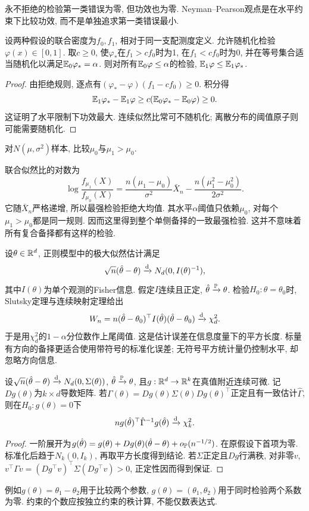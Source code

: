 永不拒绝的检验第一类错误为零, 但功效也为零. Neyman--Pearson观点是在水平约束下比较功效, 而不是单独追求第一类错误最小.
\begin{theorem}
设两种假设的联合密度为$f_0,f_1$, 相对于同一支配测度定义. 允许随机化检验$\varphi(x)\in[0,1]$. 取$c\geq0$, 使$\varphi_*$在$f_1>cf_0$时为1, 在$f_1<cf_0$时为0, 并在等号集合适当随机化以满足$\mathbb E_0\varphi_*=\alpha$. 则对所有$\mathbb E_0\varphi\leq\alpha$的检验, $\mathbb E_1\varphi\leq\mathbb E_1\varphi_*$.
\end{theorem}
\begin{proof}
由拒绝规则, 逐点有$(\varphi_*-\varphi)(f_1-cf_0)\geq0$. 积分得
\[
 \mathbb E_1\varphi_*-\mathbb E_1\varphi\geq c(\mathbb E_0\varphi_*-\mathbb E_0\varphi)\geq0.
\]
这证明了水平限制下功效最大. 连续似然比常可不随机化; 离散分布的阈值原子则可能需要随机化.
\end{proof}
\begin{example}
对$N(\mu,\sigma^2)$样本, 比较$\mu_0$与$\mu_1>\mu_0$.
\end{example}
\begin{solution}
联合似然比的对数为
\[
 \log\frac{f_{\mu_1}(X)}{f_{\mu_0}(X)}
 =\frac{n(\mu_1-\mu_0)}{\sigma^2}\bar X_n
 -\frac{n(\mu_1^2-\mu_0^2)}{2\sigma^2}.
\]
它随$\bar X_n$严格递增, 所以最强检验拒绝大均值. 其水平$\alpha$阈值只依赖$\mu_0$, 对每个$\mu_1>\mu_0$都是同一规则. 因而这里得到整个单侧备择的一致最强检验. 这并不意味着所有复合备择都有这样的检验.
\end{solution}

设$\theta\in\mathbb R^d$, 正则模型中的极大似然估计满足
\[
 \sqrt n(\hat\theta-\theta)\xrightarrow{\mathrm d} N_d(0,I(\theta)^{-1}),
\]
其中$I(\theta)$为单个观测的Fisher信息. 假定$I$连续且正定, $\hat\theta\xrightarrow{\mathbb P}\theta$. 检验$H_0:\theta=\theta_0$时, Slutsky定理与连续映射定理给出
\[
 W_n=n(\hat\theta-\theta_0)^\top I(\hat\theta)(\hat\theta-\theta_0)\xrightarrow{\mathrm d}\chi_d^2.
\]
于是用$\chi_d^2$的$1-\alpha$分位数作上尾阈值. 这是估计误差在信息度量下的平方长度. 标量有方向的备择更适合使用带符号的标准化误差; 无符号平方统计量仍控制水平, 却忽略方向信息.

\begin{proposition}[一般约束的Wald检验]
设$\sqrt n(\hat\theta-\theta)\xrightarrow{\mathrm d} N_d(0,\Sigma(\theta))$, $\hat\theta\xrightarrow{\mathbb P}\theta$, 且$g:\mathbb R^d\to\mathbb R^k$在真值附近连续可微. 记$Dg(\theta)$为$k\times d$导数矩阵. 若$\Gamma(\theta)=Dg(\theta)\Sigma(\theta)Dg(\theta)^\top$正定且有一致估计$\hat\Gamma$, 则在$H_0:g(\theta)=0$下
\[
 n g(\hat\theta)^\top\hat\Gamma^{-1}g(\hat\theta)\xrightarrow{\mathrm d}\chi_k^2.
\]
\end{proposition}
\begin{proof}
一阶展开为$g(\hat\theta)=g(\theta)+Dg(\theta)(\hat\theta-\theta)+o_{\mathbb P}(n^{-1/2})$. 在原假设下首项为零. 标准化后趋于$N_k(0,I_k)$, 再取平方长度得到结论. 若$\Sigma$正定且$Dg$行满秩, 对非零$v$, $v^\top\Gamma v=(Dg^\top v)^\top\Sigma(Dg^\top v)>0$, 正定性因而得到保证.
\end{proof}
例如$g(\theta)=\theta_1-\theta_2$用于比较两个参数, $g(\theta)=(\theta_1,\theta_2)$用于同时检验两个系数为零. 约束的个数应按独立约束的秩计算, 不能仅数表达式.


